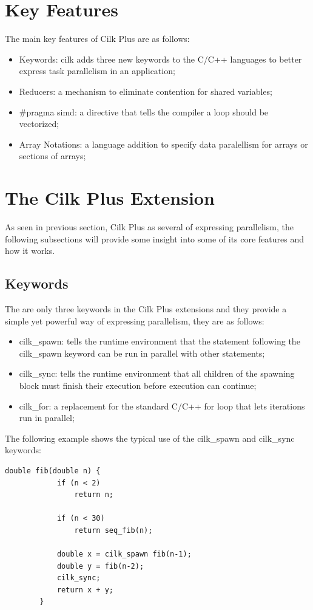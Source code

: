 \documentclass[a4paper,10pt,openright,openbib,twocolumn]{article}
\begin{document}
\section{Key Features} \label{key}

The main key features of Cilk Plus are as follows:
\begin{itemize}
    \item Keywords: cilk adds three new keywords to the C/C++ languages to better express task parallelism in an application;
    \item Reducers: a mechanism to eliminate contention for shared variables;
    \item \#pragma simd: a directive that tells the compiler a loop should be vectorized;
    \item Array Notations: a language addition to specify data paralellism for arrays or sections of arrays;
\end{itemize}


\section{The Cilk Plus Extension} \label{extension}

As seen in previous section, Cilk Plus as several of expressing parallelism, the following subsections will provide some insight into some of its core features and how it works.

\subsection {Keywords} 
The are only three keywords in the Cilk Plus extensions and they provide a simple yet powerful way of expressing parallelism, they are as follows:
\begin{itemize}
    \item cilk\_spawn: tells the runtime environment that the statement following the cilk\_spawn keyword can be run in parallel with other statements;
    \item cilk\_sync: tells the runtime environment that all children of the spawning block must finish their execution before execution can continue;
    \item cilk\_for: a replacement for the standard C/C++ for loop that lets iterations run in parallel; 
\end{itemize}
The following example shows the typical use of the cilk\_spawn and cilk\_sync keywords:
\begin{minipage}{.45\textwidth}
    \begin{lstlisting}[caption=Computation of the nth Fibonacci Number using Cilk Plus]
        double fib(double n) {
            if (n < 2)
                return n;

            if (n < 30)
                return seq_fib(n);

            double x = cilk_spawn fib(n-1);
            double y = fib(n-2);
            cilk_sync;
            return x + y;
        }
    \end{lstlisting}
\end{minipage}
\end{document}

